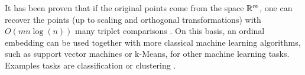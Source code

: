 It has been proven that if the original points come from the space $\mathbb{R}^{m}$, one can recover the points (up to scaling and orthogonal transformations) with $O(mn\log(n))$ many triplet comparisons
\citep{jainFiniteSamplePrediction2016}. On this basis, an ordinal embedding can be used together with more classical machine learning algorithms, such as support vector machines or k-Means,
for other machine learning tasks. Examples tasks are classification \citep{tamuzAdaptivelyLearningCrowd2011, kleindessnerLensDepthFunction2017} or clustering \citep{kleindessnerLensDepthFunction2017}.

